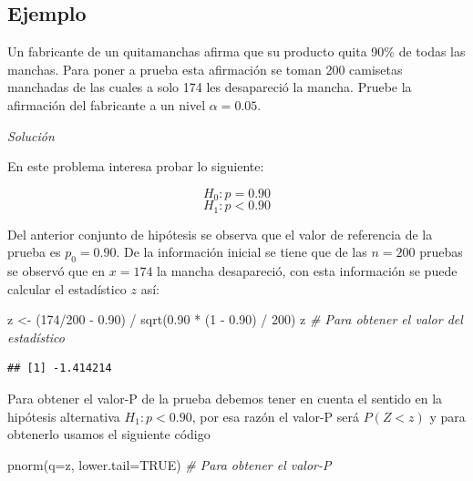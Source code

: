 \documentclass[
]{book}
\makeatletter
\newenvironment{Shaded}{\begin{snugshade}}{\end{snugshade}}
\newcommand{\AttributeTok}[1]{\textcolor[rgb]{0.77,0.63,0.00}{#1}}
\newcommand{\CommentTok}[1]{\textcolor[rgb]{0.56,0.35,0.01}{\textit{#1}}}
\newcommand{\ConstantTok}[1]{\textcolor[rgb]{0.00,0.00,0.00}{#1}}
\newcommand{\DecValTok}[1]{\textcolor[rgb]{0.00,0.00,0.81}{#1}}
\newcommand{\FloatTok}[1]{\textcolor[rgb]{0.00,0.00,0.81}{#1}}
\newcommand{\FunctionTok}[1]{\textcolor[rgb]{0.00,0.00,0.00}{#1}}
\newcommand{\NormalTok}[1]{#1}
\newcommand{\OtherTok}[1]{\textcolor[rgb]{0.56,0.35,0.01}{#1}}
\newcommand{\SpecialCharTok}[1]{\textcolor[rgb]{0.00,0.00,0.00}{#1}}
\newenvironment{kframe}{%
\medskip{}
\setlength{\fboxsep}{.8em}
 \def\at@end@of@kframe{}%
 \ifinner\ifhmode%
  \def\at@end@of@kframe{\end{minipage}}%
  \begin{minipage}{\columnwidth}%
 \fi\fi%
 \def\FrameCommand##1{\hskip\@totalleftmargin \hskip-\fboxsep
 \colorbox{shadecolor}{##1}\hskip-\fboxsep
     \hskip-\linewidth \hskip-\@totalleftmargin \hskip\columnwidth}%
 \MakeFramed {\advance\hsize-\width
   \@totalleftmargin\z@ \linewidth\hsize
   \@setminipage}}%
 {\par\unskip\endMakeFramed%
 \at@end@of@kframe}
\renewenvironment{Shaded}{\begin{kframe}}{\end{kframe}}
\makeatother
\begin{document}
\hypertarget{ejemplo-65}{%
\subsection*{Ejemplo}\label{ejemplo-65}}

Un fabricante de un quitamanchas afirma que su producto quita 90\% de todas las manchas. Para poner a prueba esta afirmación se toman 200 camisetas manchadas de las cuales a solo 174 les desapareció la mancha. Pruebe la afirmación del fabricante a un nivel \(\alpha=0.05\).

\emph{Solución}

En este problema interesa probar lo siguiente:

\[H_0: p = 0.90\]
\[H_1: p < 0.90\]

Del anterior conjunto de hipótesis se observa que el valor de referencia de la prueba es \(p_0=0.90\). De la información inicial se tiene que de las \(n=200\) pruebas se observó que en \(x=174\) la mancha desapareció, con esta información se puede calcular el estadístico \(z\) así:

\begin{Shaded}
\begin{Highlighting}[]
\NormalTok{z }\OtherTok{\textless{}{-}}\NormalTok{ (}\DecValTok{174}\SpecialCharTok{/}\DecValTok{200} \SpecialCharTok{{-}} \FloatTok{0.90}\NormalTok{) }\SpecialCharTok{/} \FunctionTok{sqrt}\NormalTok{(}\FloatTok{0.90} \SpecialCharTok{*}\NormalTok{ (}\DecValTok{1} \SpecialCharTok{{-}} \FloatTok{0.90}\NormalTok{) }\SpecialCharTok{/} \DecValTok{200}\NormalTok{)}
\NormalTok{z  }\CommentTok{\# Para obtener el valor del estadístico}
\end{Highlighting}
\end{Shaded}

\begin{verbatim}
## [1] -1.414214
\end{verbatim}

Para obtener el valor-P de la prueba debemos tener en cuenta el sentido en la hipótesis alternativa \(H_1: p < 0.90\), por esa razón el valor-P será \(P(Z<z)\) y para obtenerlo usamos el siguiente código

\begin{Shaded}
\begin{Highlighting}[]
\FunctionTok{pnorm}\NormalTok{(}\AttributeTok{q=}\NormalTok{z, }\AttributeTok{lower.tail=}\ConstantTok{TRUE}\NormalTok{)  }\CommentTok{\# Para obtener el valor{-}P}
\end{Highlighting}
\end{Shaded}
\end{document}
